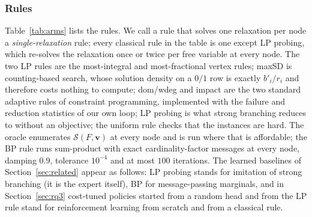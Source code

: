 \documentclass[final,5p,times,twocolumn,authoryear]{elsarticle}
\newcommand{\SOL}{\mathcal{S}}
\begin{document}
\subsubsection{Rules}
Table~\ref{tab:arms} lists the rules. We call a rule that solves one relaxation per node a \emph{single-relaxation} rule; every classical rule in the table is one except LP probing, which re-solves the relaxation once or twice per free variable at every node. The two LP rules are the most-integral and most-fractional vertex rules; maxSD is counting-based search, whose solution density on a $0/1$ row is exactly $b'_i/r_i$ and therefore costs nothing to compute; dom/wdeg and impact are the two standard adaptive rules of constraint programming, implemented with the failure and reduction statistics of our own loop; LP probing is what strong branching reduces to without an objective; the uniform rule checks that the instances are hard. The oracle enumerates $\SOL(F,\mathbf{v})$ at every node and is run where that is affordable; the BP rule runs sum-product with exact cardinality-factor messages at every node, damping $0.9$, tolerance $10^{-4}$ and at most $100$ iterations. The learned baselines of Section~\ref{sec:related} appear as follows: LP probing stands for imitation of strong branching (it is the expert itself), BP for message-passing marginals, and in Section~\ref{sec:rq3} cost-tuned policies started from a random head and from the LP rule stand for reinforcement learning from scratch and from a classical rule.
\end{document}
